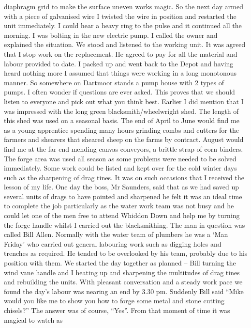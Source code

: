 diaphragm grid to make the surface uneven works magic.  So the next day armed
with a piece of galvanised wire I twisted the wire in position and restarted
the unit immediately.  I could hear a heavy ring to the pulse and it continued
all the morning.  I was bolting in the new electric pump.  I called the owner
and explained the situation.  We stood and listened to the working unit.  It
was agreed that I stop work on the replacement.  He agreed to pay for all the
material and labour provided to date.  I packed up and went back to the Depot
and having heard nothing more I assumed that things were working in a long
monotonous manner.  So somewhere on Dartmoor stands a pump house with 2 types
of pumps.   I often wonder if questions are ever asked.  This proves that we
should listen to everyone and pick out what you think best. Earlier I did
mention that I was impressed with the long green blacksmith/wheelwright shed.
The length of this shed was used on a seasonal basis.  The end of April to June
would find me as a young apprentice spending many hours grinding combs and
cutters for the farmers and shearers that sheared sheep on the farms by
contract.  August would find me at the far end mending canvas conveyors, a
brittle strap of corn binders. The forge area was used all season as some
problems were needed to be solved immediately.  Some work could be listed and
kept over for the cold winter days such as the sharpening of drag tines.  It
was on such occasions that I received the lesson of my life. One day the boss,
Mr Saunders, said that as we had saved up several units of drags to have
pointed and sharpened he felt it was an ideal time to complete the job
particularly as the water work team was not busy and he could let one of the
men free to attend Whiddon Down and help me by turning the forge handle whilst
I carried out the blacksmithing.  The man in question was called Bill Allen.
Normally with the water team of plumbers he was a ‘Man Friday' who carried out
general labouring work such as digging holes and trenches as required.  He
tended to be overlooked by his team, probably due to his position with them. We
started the day together as planned – Bill turning the wind vane handle and I
heating up and sharpening the multitudes  of drag tines and rebuilding the
units.  With pleasant conversation and a steady work pace we found the day's
labour was nearing an end by 3.30 pm.  Suddenly Bill said ``Mike would you like
me to show you how to forge some metal and stone cutting chisels?''  The answer
was of course, ``Yes''.  From that moment of time it was magical to watch as
